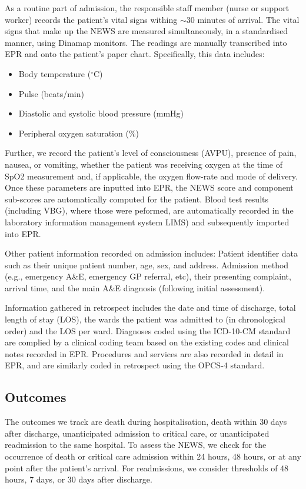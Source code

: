 \documentclass[10pt,journal, compsoc]{IEEEtran}
\begin{document}
As a routine part of admission, the responsible staff member (nurse or support worker) records the patient's vital signs withing $\sim 30$ minutes of arrival. The vital signs that make up the NEWS are measured simultaneously, in a standardised manner, using Dinamap monitors. The readings are manually transcribed into EPR and onto the patient's paper chart. Specifically, this data includes:
\begin{itemize}
    \item Body temperature ($^{\circ}$C)
    \item Pulse (beats/min)
    \item Diastolic and systolic blood pressure (mmHg)
    \item Peripheral oxygen saturation (\%)
\end{itemize}
Further, we record the patient's level of consciousness (AVPU), presence of pain, nausea, or vomiting, whether the patient was receiving oxygen at the time of SpO2 measurement and, if applicable, the oxygen flow-rate and mode of delivery. Once these parameters are inputted into EPR, the NEWS score and component sub-scores are automatically computed for the patient. Blood test results (including VBG), where those were peformed, are automatically recorded in the laboratory information management system LIMS) and subsequently imported into EPR.

Other patient information recorded on admission includes: Patient identifier data such as their unique patient number, age, sex, and address. Admission method (e.g., emergency A\&E, emergency GP referral, etc), their presenting complaint, arrival time, and the main A\&E diagnosis (following initial assessment).

Information gathered in retrospect includes the date and time of discharge, total length of stay (LOS), the wards the patient was admitted to (in chronological order) and the LOS per ward. Diagnoses coded using the ICD-10-CM standard are complied by a clinical coding team based on the existing codes and clinical notes recorded in EPR. Procedures and services are also recorded in detail in EPR, and are similarly coded in retrospect using the OPCS-4 standard.

\subsection{Outcomes} The outcomes we track are death during hospitalisation, death within 30 days after discharge, unanticipated admission to critical care, or unanticipated readmission to the same hospital. To assess the NEWS, we check for the occurrence of death or critical care admission within 24 hours, 48 hours, or at any point after the patient's arrival. For readmissions, we consider thresholds of 48 hours, 7 days, or 30 days after discharge.
\end{document}
